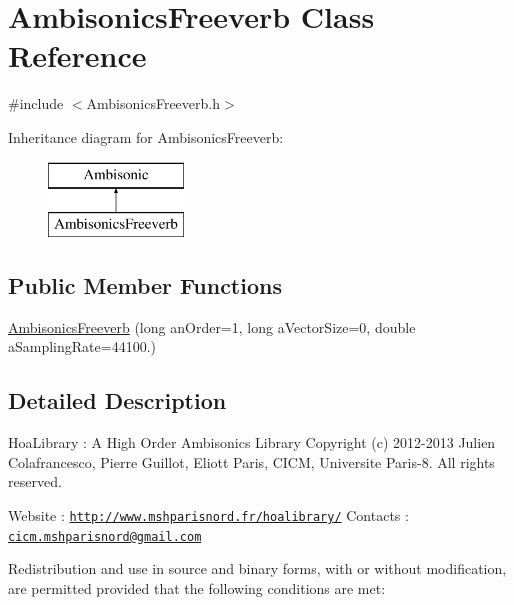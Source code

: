 \hypertarget{class_ambisonics_freeverb}{\section{Ambisonics\-Freeverb Class Reference}
\label{class_ambisonics_freeverb}
}


{\ttfamily \#include $<$Ambisonics\-Freeverb.\-h$>$}

Inheritance diagram for Ambisonics\-Freeverb\-:\begin{figure}[H]
\begin{center}
\leavevmode
\includegraphics[height=2.000000cm]{class_ambisonics_freeverb}
\end{center}
\end{figure}
\subsection*{Public Member Functions}
\begin{DoxyCompactItemize}
\item 
\hyperlink{class_ambisonics_freeverb_a837e51d85f2a237e7957b6534f3bde1c}{Ambisonics\-Freeverb} (long an\-Order=1, long a\-Vector\-Size=0, double a\-Sampling\-Rate=44100.)
\end{DoxyCompactItemize}


\subsection{Detailed Description}
Hoa\-Library \-: A High Order Ambisonics Library Copyright (c) 2012-\/2013 Julien Colafrancesco, Pierre Guillot, Eliott Paris, C\-I\-C\-M, Universite Paris-\/8. All rights reserved.

Website \-: \href{http://www.mshparisnord.fr/hoalibrary/}{\tt http\-://www.\-mshparisnord.\-fr/hoalibrary/} Contacts \-: \href{mailto:cicm.mshparisnord@gmail.com}{\tt cicm.\-mshparisnord@gmail.\-com}

Redistribution and use in source and binary forms, with or without modification, are permitted provided that the following conditions are met\-:


